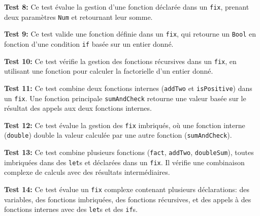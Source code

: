 \documentclass{article}
\begin{document}
\textbf{Test 8:}  
   Ce test évalue la gestion d'une fonction déclarée dans un \texttt{fix}, prenant deux paramètres \texttt{Num} et retournant leur somme.

\textbf{Test 9:} 
   Ce test valide une fonction définie dans un \texttt{fix}, qui retourne un \texttt{Bool} en fonction d'une condition \texttt{if} basée sur un entier donné.

\textbf{Test 10:}  
   Ce test vérifie la gestion des fonctions récursives dans un \texttt{fix}, en utilisant une fonction pour calculer la factorielle d'un entier donné.

\textbf{Test 11:}  
   Ce test combine deux fonctions internes (\texttt{addTwo} et \texttt{isPositive}) dans un \texttt{fix}. Une fonction principale \texttt{sumAndCheck} retourne une valeur basée sur le résultat des appels aux deux fonctions internes.

\textbf{Test 12:}  
   Ce test évalue la gestion des \texttt{fix} imbriqués, où une fonction interne (\texttt{double}) double la valeur calculée par une autre fonction (\texttt{sumAndCheck}).

\textbf{Test 13:}  
   Ce test combine plusieurs fonctions (\texttt{fact}, \texttt{addTwo}, \texttt{doubleSum}), toutes imbriquées dans des \texttt{let}s et déclarées dans un \texttt{fix}. Il vérifie une combinaison complexe de calculs avec des résultats intermédiaires.

\textbf{Test 14:}  
   Ce test évalue un \texttt{fix} complexe contenant plusieurs déclarations: des variables, des fonctions imbriquées, des fonctions récursives, et des appels à des fonctions internes avec des \texttt{let}s et des \texttt{if}s.
\end{document}
